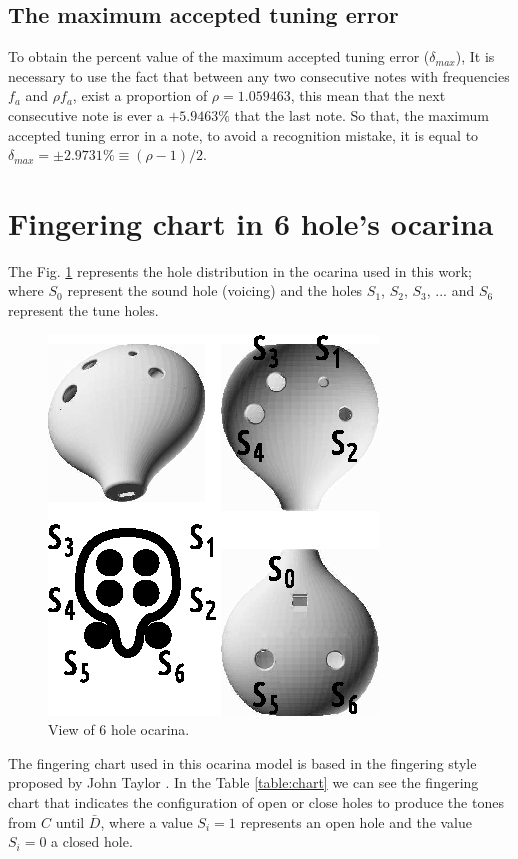 \documentclass[journal]{IEEEtran}
\begin{document}
\subsection{The maximum accepted tuning error}
To obtain the percent value of the maximum accepted tuning error ($\delta_{max}$),
It is necessary to use the fact that between any two consecutive notes with frequencies
$f_a$ and $\rho f_a$, exist a proportion of $\rho=1.059463$, this mean
that the next consecutive note is ever a $+5.9463\%$ that the last note. So that,
the maximum accepted tuning error in a note, 
to avoid a recognition mistake, it is equal to $\delta_{max} = \pm 2.9731\% \equiv (\rho-1)/2$.



\section{Fingering chart in  6 hole's ocarina}
The Fig. \ref{fig:ocarinaview} represents the hole distribution in the ocarina
used in this work; where $S_0$ represent the sound hole (voicing)
and the holes $S_1$, $S_2$, $S_3$, ... and $S_6$ represent the tune holes.
\begin{figure}[ht!]
\centering
\includegraphics[width=0.50\columnwidth]{ocarina-view.eps}
\caption{View of 6 hole ocarina. }
\label{fig:ocarinaview}
\end{figure}
The fingering chart used in this ocarina model is based in the 
fingering style proposed by John Taylor \cite{JohnTaylorRef}. In the
Table \ref{table:chart} we can see the fingering chart that indicates the configuration of open or close holes
to produce the tones from $C$ until $\bar{D}$, where a value $S_i=1$ represents an
open hole and the value $S_i=0$ a closed hole.
\end{document}
